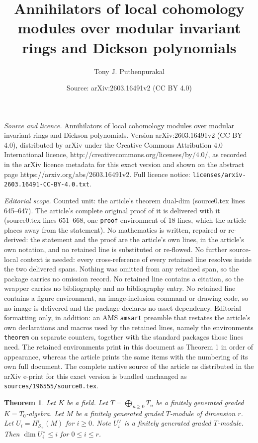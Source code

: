 \documentclass[10pt,a4paper]{amsart}
\title{Annihilators of local cohomology modules over modular invariant rings and Dickson polynomials}
\author{Tony J. Puthenpurakal}
\date{Source: arXiv:2603.16491v2 (CC BY 4.0)}
\newtheorem{theorem}{Theorem}
\begin{document}
\maketitle

\noindent\emph{Source and licence.} Annihilators of local cohomology modules over modular invariant rings and Dickson polynomials. Version arXiv:2603.16491v2 (CC BY 4.0), distributed by arXiv under the Creative Commons Attribution 4.0 International licence, http://creativecommons.org/licenses/by/4.0/, as recorded in the arXiv licence metadata for this exact version and shown on the abstract page https://arxiv.org/abs/2603.16491v2. Full licence notice: \texttt{licenses/arxiv-2603.16491-CC-BY-4.0.txt}.\par\smallskip

\noindent\textit{Editorial scope.} Counted unit: the article's theorem dual-dim (source0.tex lines 645--647). The article's complete original proof of it is delivered with it (source0.tex lines 651--668, one \texttt{proof} environment of 18 lines, which the article places away from the statement). No mathematics is written, repaired or re-derived: the statement and the proof are the article's own lines, in the article's own notation, and no retained line is substituted or re-flowed.  No further source-local context is needed: every cross-reference of every retained line resolves inside the two delivered spans.  Nothing was omitted from any retained span, so the package carries no omission record.  No retained line contains a citation, so the wrapper carries no bibliography and no bibliography entry.  No retained line contains a figure environment, an image-inclusion command or drawing code, so no image is delivered and the package declares no asset dependency.  Editorial formatting only, in addition: an AMS \texttt{amsart} preamble that restates the article's own declarations and macros used by the retained lines, namely the environments \texttt{theorem} on separate counters, together with the standard packages those lines need.  The retained environments print in this document as Theorem 1 in order of appearance, whereas the article prints the same items with the numbering of its own full document.  The complete native source of the article as distributed in the arXiv e-print for this exact version is bundled unchanged as \texttt{sources/196555/source0.tex}.
\begin{theorem}
\label{dual-dim} Let $K$ be a field. Let $T= \bigoplus_{n \geq 0}T_n$ be a finitely generated graded $K = T_0$-algebra. Let $M$ be a finitely generated graded $T$-module of dimension $r$. Let $U_i = H^i_{S_+}(M)$  for $i \geq 0$. Note $U_i^{\vee}$ is a finitely generated graded $T$-module. Then $\dim U_i^\vee \leq i$ for $0 \leq i \leq r$.
\end{theorem}
\end{document}
